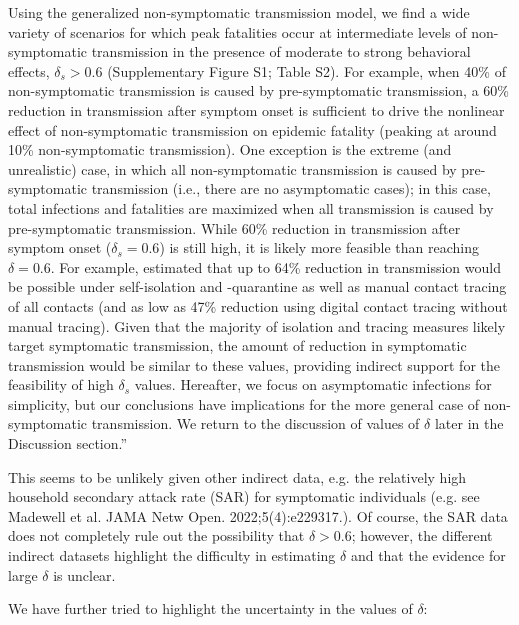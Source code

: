 \documentclass[12pt]{article}
\newcommand{\revtext}{\textsf}
\begin{document}
Using the generalized non-symptomatic transmission model, we find a wide variety of scenarios for which peak fatalities occur at intermediate levels of non-symptomatic transmission in the presence of moderate to strong behavioral effects, $\delta_s > 0.6$ (Supplementary Figure S1; Table S2).
For example, when 40\% of non-symptomatic transmission is caused by pre-symptomatic transmission, a 60\% reduction in transmission after symptom onset is sufficient to drive the nonlinear effect of non-symptomatic transmission on epidemic fatality (peaking at around 10\% non-symptomatic transmission).
One exception is the extreme (and unrealistic) case, in which all non-symptomatic transmission is caused by pre-symptomatic transmission (i.e., there are no asymptomatic cases);
in this case, total infections and fatalities are maximized when all transmission is caused by pre-symptomatic transmission. 
While 60\% reduction in transmission after symptom onset ($\delta_s = 0.6$) is still high, it is likely more feasible than reaching $\delta = 0.6$.
For example, \cite{kucharski2020effectiveness} estimated that up to 64\% reduction in transmission would be possible under self-isolation and -quarantine as well as manual contact tracing of all contacts (and as low as 47\% reduction using digital contact tracing without manual tracing).
Given that the majority of isolation and tracing measures likely target symptomatic transmission, the amount of reduction in symptomatic transmission would be similar to these values, providing indirect support for the feasibility of high $\delta_s$ values. 
Hereafter, we focus on asymptomatic infections for simplicity, but our conclusions have implications for the more general case of non-symptomatic transmission.
We return to the discussion of values of $\delta$ later in the Discussion section.''

\revtext{This seems to be unlikely given other indirect data, e.g. the relatively high household secondary attack rate (SAR) for symptomatic individuals (e.g. see Madewell et al. JAMA Netw Open. 2022;5(4):e229317.). Of course, the SAR data does not completely rule out the possibility that $\delta>0.6$; however, the different indirect datasets highlight the difficulty in estimating $\delta$ and that the evidence for large $\delta$ is unclear.}

We have further tried to highlight the uncertainty in the values of $\delta$:
\end{document}
